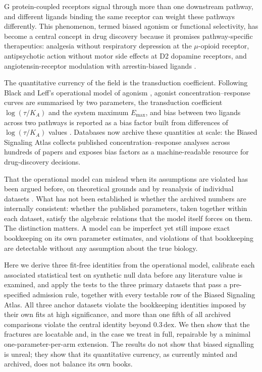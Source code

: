 ﻿\documentclass[11pt,a4paper]{article}
\newcommand{\dex}{\ensuremath{\,\mathrm{dex}}}
\newcommand{\logR}{\ensuremath{\log(\tau/K_{\!A})}}
\newcommand{\Emax}{\ensuremath{E_{\max}}}
\begin{document}
G protein-coupled receptors signal through more than one downstream pathway, and different ligands binding the same receptor can weight these pathways differently. This phenomenon, termed biased agonism or functional selectivity, has become a central concept in drug discovery because it promises pathway-specific therapeutics: analgesia without respiratory depression at the $\mu$-opioid receptor, antipsychotic action without motor side effects at D2 dopamine receptors, and angiotensin-receptor modulation with arrestin-biased ligands \cite{Violin2007,Urban2007,Rajagopal2010,KenakinChristopoulos2013}.

The quantitative currency of the field is the transduction coefficient. Following Black and Leff's operational model of agonism \cite{BlackLeff1983}, agonist concentration--response curves are summarised by two parameters, the transduction coefficient $\logR$ and the system maximum $\Emax$, and bias between two ligands across two pathways is reported as a bias factor built from differences of $\logR$ values \cite{Kenakin2012,Kenakin2019}. Databases now archive these quantities at scale: the Biased Signaling Atlas collects published concentration--response analyses across hundreds of papers and exposes bias factors as a machine-readable resource for drug-discovery decisions.

That the operational model can mislead when its assumptions are violated has been argued before, on theoretical grounds \cite{Ehlert2008} and by reanalysis of individual datasets \cite{Onaran2017,StahlBohn2022}. What has not been established is whether the archived numbers are internally consistent: whether the published parameters, taken together within each dataset, satisfy the algebraic relations that the model itself forces on them. The distinction matters. A model can be imperfect yet still impose exact bookkeeping on its own parameter estimates, and violations of that bookkeeping are detectable without any assumption about the true biology.

Here we derive three fit-free identities from the operational model, calibrate each associated statistical test on synthetic null data before any literature value is examined, and apply the tests to the three primary datasets that pass a pre-specified admission rule, together with every testable row of the Biased Signaling Atlas. All three anchor datasets violate the bookkeeping identities imposed by their own fits at high significance, and more than one fifth of all archived comparisons violate the central identity beyond $0.3\dex$. We then show that the fractures are locatable and, in the case we treat in full, repairable by a minimal one-parameter-per-arm extension. The results do not show that biased signalling is unreal; they show that its quantitative currency, as currently minted and archived, does not balance its own books.
\end{document}
